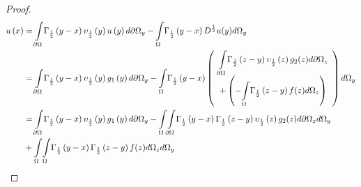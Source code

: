 \documentclass{amsart}%
\theoremstyle{plain}
\numberwithin{equation}{section}
\begin{document}
\begin{proof}
\begin{align*}
u\left(  x\right)   & =%
{\displaystyle\int\limits_{\partial\Omega}}
\Gamma_{\frac{1}{2}}\left(  y-x\right)  \upsilon_{\frac{1}{2}}\left(
y\right)  u\left(  y\right)  d\partial\Omega_{y}-%
{\displaystyle\int\limits_{\Omega}}
\Gamma_{\frac{1}{2}}\left(  y-x\right)  D^{\frac{1}{2}}u(y)d\Omega_{y}\\
& =%
{\displaystyle\int\limits_{\partial\Omega}}
\Gamma_{\frac{1}{2}}\left(  y-x\right)  \upsilon_{\frac{1}{2}}\left(
y\right)  g_{1}\left(  y\right)  d\partial\Omega_{y}-%
{\displaystyle\int\limits_{\Omega}}
\Gamma_{\frac{1}{2}}\left(  y-x\right)  \left(
\begin{array}
[c]{c}%
{\displaystyle\int\limits_{\partial\Omega}}
\Gamma_{\frac{1}{2}}\left(  z-y\right)  \upsilon_{\frac{1}{2}}\left(
z\right)  g_{2}(z)d\partial\Omega_{z}\\
+\left(  -%
{\displaystyle\int\limits_{\Omega}}
\Gamma_{\frac{1}{2}}\left(  z-y\right)  f(z)d\Omega_{z}\right)
\end{array}
\right)  d\Omega_{y}\\
& =%
{\displaystyle\int\limits_{\partial\Omega}}
\Gamma_{\frac{1}{2}}\left(  y-x\right)  \upsilon_{\frac{1}{2}}\left(
y\right)  g_{1}\left(  y\right)  d\partial\Omega_{y}-%
{\displaystyle\int\limits_{\Omega}}
{\displaystyle\int\limits_{\partial\Omega}}
\Gamma_{\frac{1}{2}}\left(  y-x\right)  \Gamma_{\frac{1}{2}}\left(
z-y\right)  \upsilon_{\frac{1}{2}}\left(  z\right)  g_{2}(z)d\partial
\Omega_{z}d\Omega_{y}\\
& +%
{\displaystyle\int\limits_{\Omega}}
{\displaystyle\int\limits_{\Omega}}
\Gamma_{\frac{1}{2}}\left(  y-x\right)  \Gamma_{\frac{1}{2}}\left(
z-y\right)  f(z)d\Omega_{z}d\Omega_{y}%
\end{align*}



\end{proof}
\end{document}
